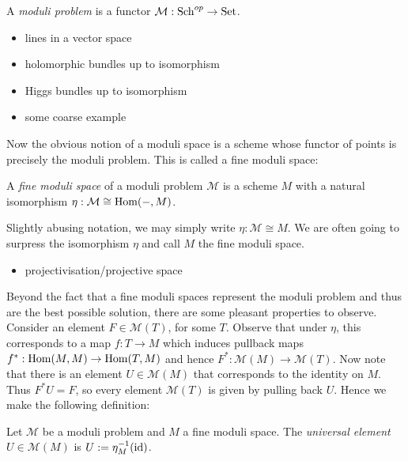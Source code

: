 \documentclass[12pt]{ociamthesis}  %
\begin{document}
\begin{definition}
  A \emph{moduli problem} is a functor $\mathcal M:\operatorname{Sch}^{op}\to\operatorname{Set}$.
\end{definition}

\begin{example}
  \missingexample
  \begin{itemize}
    \item lines in a vector space
    \item holomorphic bundles up to isomorphism
    \item Higgs bundles up to isomorphism
    \item some coarse example
  \end{itemize}
\end{example}

Now the obvious notion of a moduli space is a scheme whose functor
of points is precisely the moduli problem. This is called a fine
moduli space:

\begin{definition}
  A \emph{fine moduli space} of a moduli problem $\mathcal M$
  is a scheme $M$ with a natural isomorphism
  $\eta : \mathcal M \cong \operatorname{Hom}(-,M)$.
\end{definition}

Slightly abusing notation, we may simply write
$\eta : \mathcal M \cong M$. We are often going to surpress the
isomorphism $\eta$ and call $M$ the fine moduli space.

\begin{example}
  \begin{itemize}
    \item projectivisation/projective space
  \end{itemize}
\end{example}

Beyond the fact that a fine moduli spaces represent the moduli
problem and thus are the best possible solution, there are some
pleasant properties to observe. Consider an element
$F\in\mathcal M(T)$, for some $T$. Observe that under $\eta$,
this corresponds to a map $f:T\to M$ which induces pullback maps
$f^* : \operatorname{Hom}(M,M)\to\operatorname{Hom}(T,M)$ and hence
$F^* : \mathcal M(M)\to \mathcal M(T)$.
Now note that there is an element $U\in\mathcal M(M)$ that
corresponds to the identity on $M$. Thus $F^* U = F$, so every
element $\mathcal M(T)$ is given by pulling back $U$. Hence
we make the following definition:

\begin{definition}
  Let $\mathcal M$ be a moduli problem and $M$ a fine moduli space.
  The \emph{universal element} $U\in\mathcal M(M)$ is
  $U:=\eta^{-1}_M (\operatorname{id})$.
\end{definition}
\end{document}
